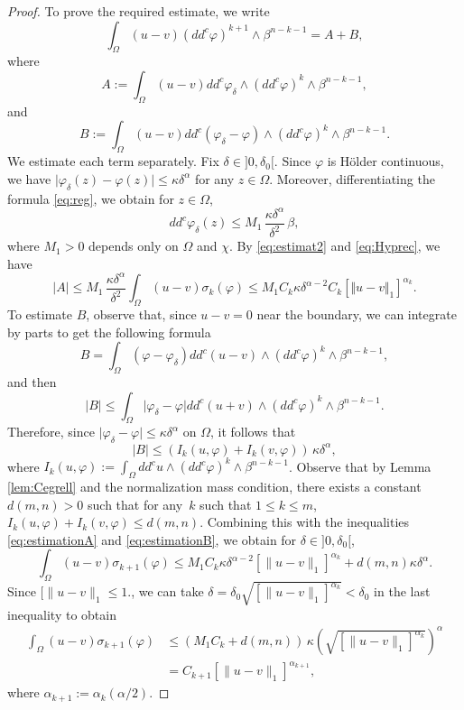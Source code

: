 \begin{proof}
To prove the required estimate, we write
\[
\int_{\Omega}(u-v) (dd^c\varphi)^{k+1} \wedge\beta^{n-k-1} = A + B,
\]
where
\[
A:=\int_{\Omega}(u-v)dd^c \varphi_{\delta}\wedge(dd^c\varphi)^k\wedge\beta^{n-k-1},
\]
and
\[
B := \int_{\Omega}(u-v) dd^c(\varphi_{\delta}-\varphi)\wedge(dd^c\varphi)^k\wedge\beta^{n-k-1}.
\]
We estimate each term separately.
Fix $\delta\in{}]0,\delta_0[$. Since $\varphi$ is Hölder continuous, we have $\vert \varphi_{\delta} (z) - \varphi (z)\vert \leq \kappa \delta^{\alpha}$ for any $z \in \Omega$. Moreover, differentiating the formula \eqref{eq:reg}, we obtain for $z \in \Omega$,
\begin{equation} \label{eq:estimat2}
dd^c \varphi_{\delta} (z) \leq M_1\, \frac{ \kappa \delta^{\alpha}}{\delta^2}\, \beta,
\end{equation}
where $M_1 > 0$ depends only on $\Omega$ and $\chi$. By \eqref{eq:estimat2} and \eqref{eq:Hyprec}, we have
\begin{equation} \label{eq:estimationA}
|A|\leq M_1\, \frac{\kappa \delta^{\alpha}}{\delta^2} \int_{\Omega}(u-v) \sigma_{k}(\varphi)
\leq M_1 C_k \kappa \delta^{\alpha - 2} C_{k} \left[\Vert u-v \Vert_1\right]^{\alpha_k}.
\end{equation}
To estimate $B$, observe that, since $ u - v = 0$ near the boundary, we can integrate by parts to get the following formula
\[
B = \int_{\Omega} (\varphi-\varphi_{\delta}) dd^c (u-v) \wedge(dd^c\varphi)^k\wedge\beta^{n-k-1},
\]
and then
\[
\vert B\vert \leq \int_{\Omega} \vert \varphi_{\delta}-\varphi\vert dd^c (u+v) \wedge(dd^c\varphi)^k\wedge\beta^{n-k-1}.
\]
Therefore, since $\vert \varphi_{\delta}-\varphi \vert \leq \kappa \delta^{\alpha}$ on $\Omega$, it follows that
\begin{equation} \label{eq:estimationB}
|B| \leq( I_k(u,\varphi) + I_k(v,\varphi) ) \, \kappa \delta^{\alpha},
\end{equation}
where $I_k (u,\varphi):= \int_{\Omega} dd^c u \wedge(dd^c\varphi)^k\wedge\beta^{n-k-1}$. Observe that by Lemma \ref{lem:Cegrell} and the normalization mass condition, there exists a constant $d(m,n) > 0$ such that for any~$k$ such that $1 \leq k \leq m$, $I_k(u,\varphi) + I_k(v,\varphi) \leq d (m,n)$. Combining this with the inequalities \eqref{eq:estimationA} and \eqref{eq:estimationB}, we obtain for $\delta\in{}]0,\delta_0[$,
\[
\int_{\Omega}(u-v) \sigma_{k +1}(\varphi)\leq M_1 C_k \kappa \delta^{\alpha- 2} [\|u-v\|_1]^{\alpha_k}+ d(m,n) \kappa \delta^{\alpha}.
\]
Since $ [\|u-v\|_1 \leq 1$., we can take $\delta= \delta_0 \sqrt{ [\|u-v\|_1]^{\alpha_k}} < \delta_0$ in the last inequality to obtain
\begin{align*}
\int_{\Omega}(u-v) \sigma_{k+1}(\varphi) &\leq (M_1 C_k + d (m,n))\, \kappa \left(\sqrt{ [\|u-v\|_1]^{\alpha_k}}\right)^{\alpha} \\
& = C_{k + 1} [\|u-v\|_1]^{\alpha_{k+ 1}},
\end{align*}
where $\alpha_{k + 1}:= \alpha_k (\alpha \slash 2)$.
\end{proof}

